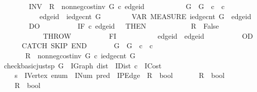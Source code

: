 \begin{isabellebody}
\ \ \ \ \ \ \ \ INV\ {\isasymlbrace}\ {\isasymacute}R\ {\isacharequal}\ non{\isacharunderscore}neg{\isacharunderscore}cost{\isacharunderscore}inv\ {\isasymacute}G\ {\isasymacute}c\ {\isasymacute}edge{\isacharunderscore}id\isanewline
\ \ \ \ \ \ \ \ \ \ {\isasymand}\ {\isasymacute}G\ {\isacharequal}\ G\ {\isasymand}\ {\isasymacute}c\ {\isacharequal}\ c\isanewline
\ \ \ \ \ \ \ \ \ \ {\isasymand}\ {\isasymacute}edge{\isacharunderscore}id\ {\isasymle}\ iedge{\isacharunderscore}cnt\ {\isasymacute}G{\isasymrbrace}\isanewline
\ \ \ \ \ \ \ \ VAR\ MEASURE\ {\isacharparenleft}iedge{\isacharunderscore}cnt\ {\isasymacute}G\ {\isacharminus}\ {\isasymacute}edge{\isacharunderscore}id{\isacharparenright}\isanewline
\ \ \ \ \ \ \ \ DO\isanewline
\ \ \ \ \ \ \ \ \ \ IF\ {\isasymacute}c\ {\isasymacute}edge{\isacharunderscore}id\ {\isacharless}\ {}\ THEN\isanewline
\ \ \ \ \ \ \ \ \ \ \ \ {\isasymacute}R\ {\isacharcolon}{\isacharequal}{\isacharequal}\ False\ {\isacharsemicolon}{\isacharsemicolon}\isanewline
\ \ \ \ \ \ \ \ \ \ \ \ THROW\isanewline
\ \ \ \ \ \ \ \ \ \ FI\ {\isacharsemicolon}{\isacharsemicolon}\isanewline
\ \ \ \ \ \ \ \ \ \ {\isasymacute}edge{\isacharunderscore}id\ {\isacharcolon}{\isacharequal}{\isacharequal}\ {\isasymacute}edge{\isacharunderscore}id\ {\isacharplus}\ {}\isanewline
\ \ \ \ \ \ \ \ OD\isanewline
\ \ \ \ \ \ CATCH\ SKIP\ END\isanewline
\ \ \ \ \ \ {\isasymlbrace}\ {\isasymacute}G\ {\isacharequal}\ G\ {\isasymand}\ {\isasymacute}c\ {\isacharequal}\ c\isanewline
\ \ \ \ \ \ {\isasymand}\ {\isasymacute}R\ {\isacharequal}\ non{\isacharunderscore}neg{\isacharunderscore}cost{\isacharunderscore}inv\ {\isasymacute}G\ {\isasymacute}c\ {\isacharparenleft}iedge{\isacharunderscore}cnt\ {\isasymacute}G{\isacharparenright}\ {\isasymrbrace}\isanewline
\ \ \ \ {\isachardoublequoteclose}\isanewline
\isanewline
{}\isamarkupfalse%
\ check{\isacharunderscore}basic{\isacharunderscore}just{\isacharunderscore}sp\ {\isacharparenleft}G\ {\isacharcolon}{\isacharcolon}\ IGraph{\isacharcomma}\ dist\ {\isacharcolon}{\isacharcolon}\ IDist{\isacharcomma}\ c\ {\isacharcolon}{\isacharcolon}\ ICost{\isacharcomma}\ \isanewline
\ \ \ \ s\ {\isacharcolon}{\isacharcolon}\ IVertex{\isacharcomma}\ enum\ {\isacharcolon}{\isacharcolon}\ INum{\isacharcomma}\ pred\ {\isacharcolon}{\isacharcolon}\ IPEdge\ {\isacharbar}\ R\ {\isacharcolon}{\isacharcolon}\ bool{\isacharparenright}\isanewline
\ \ \isanewline
\ \ \ \ R{}\ {\isacharcolon}{\isacharcolon}\ bool\isanewline
\ \ \ \ R{}\ {\isacharcolon}{\isacharcolon}\ bool\isanewline

\end{isabellebody}
